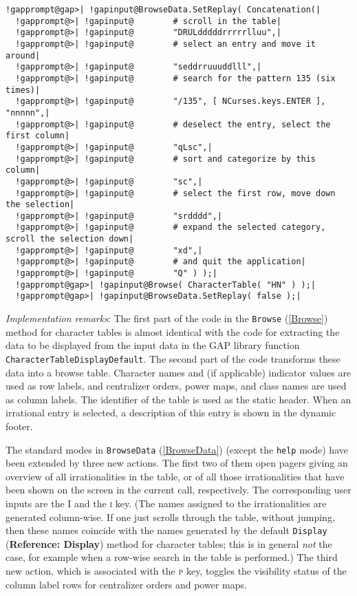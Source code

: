 \documentclass[a4paper,11pt]{report}
\begin{document}
{{{ 
\begin{Verbatim}[commandchars=!@|,fontsize=\small,frame=single,label=Example]
  !gapprompt@gap>| !gapinput@BrowseData.SetReplay( Concatenation(|
  !gapprompt@>| !gapinput@        # scroll in the table|
  !gapprompt@>| !gapinput@        "DRULdddddrrrrrlluu",|
  !gapprompt@>| !gapinput@        # select an entry and move it around|
  !gapprompt@>| !gapinput@        "seddrruuuddlll",|
  !gapprompt@>| !gapinput@        # search for the pattern 135 (six times)|
  !gapprompt@>| !gapinput@        "/135", [ NCurses.keys.ENTER ], "nnnnn",|
  !gapprompt@>| !gapinput@        # deselect the entry, select the first column|
  !gapprompt@>| !gapinput@        "qLsc",|
  !gapprompt@>| !gapinput@        # sort and categorize by this column|
  !gapprompt@>| !gapinput@        "sc",|
  !gapprompt@>| !gapinput@        # select the first row, move down the selection|
  !gapprompt@>| !gapinput@        "srdddd",|
  !gapprompt@>| !gapinput@        # expand the selected category, scroll the selection down|
  !gapprompt@>| !gapinput@        "xd",|
  !gapprompt@>| !gapinput@        # and quit the application|
  !gapprompt@>| !gapinput@        "Q" ) );|
  !gapprompt@gap>| !gapinput@Browse( CharacterTable( "HN" ) );|
  !gapprompt@gap>| !gapinput@BrowseData.SetReplay( false );|
\end{Verbatim}
 

 \emph{Implementation remarks}: The first part of the code in the \texttt{Browse} (\ref{Browse}) method for character tables is almost identical with the code for extracting
the data to be displayed from the input data in the \textsf{GAP} library function \texttt{CharacterTableDisplayDefault}. The second part of the code transforms these data into a browse table.
Character names and (if applicable) indicator values are used as row labels,
and centralizer orders, power maps, and class names are used as column labels.
The identifier of the table is used as the static header. When an irrational
entry is selected, a description of this entry is shown in the dynamic footer. 

 The standard modes in \texttt{BrowseData} (\ref{BrowseData}) (except the \texttt{help} mode) have been extended by three new actions. The first two of them open
pagers giving an overview of all irrationalities in the table, or of all those
irrationalities that have been shown on the screen in the current call,
respectively. The corresponding user inputs are the \textsc{I} and the \textsc{i} key. (The names assigned to the irrationalities are generated column-wise. If
one just scrolls through the table, without jumping, then these names coincide
with the names generated by the default \texttt{Display} (\textbf{Reference: Display}) method for character tables; this is in general \emph{not} the case, for example when a row-wise search in the table is performed.) The
third new action, which is associated with the \textsc{p} key, toggles the visibility status of the column label rows for centralizer
orders and power maps. 

}}}
\end{document}
